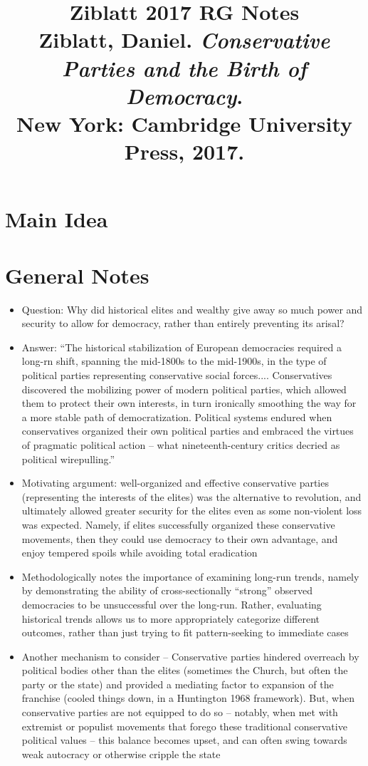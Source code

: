 \documentclass[12pt]{article}
\title{\textbf{Ziblatt 2017 RG Notes}\\
\large Ziblatt, Daniel. \textit{Conservative Parties and the Birth of Democracy}.\\
New York: Cambridge University Press, 2017.}
\author{}
\date{}
\begin{document}
\maketitle

\section{Main Idea}



\section{General Notes}

\begin{itemize}[leftmargin=*, itemsep=4pt]
    \item Question: Why did historical elites and wealthy give away so much power and security to allow for democracy, rather than entirely preventing its arisal?
    \item Answer: ``The historical stabilization of European democracies required a long-rn shift, spanning the mid-1800s to the mid-1900s, in the type of political parties representing conservative social forces.... Conservatives discovered the mobilizing power of modern political parties, which allowed them to protect their own interests, in turn ironically smoothing the way for a more stable path of democratization. Political systems endured when conservatives organized their own political parties and embraced the virtues of pragmatic political action -- what nineteenth-century critics decried as political wirepulling.''
    \item Motivating argument: well-organized and effective conservative parties (representing the interests of the elites) was the alternative to revolution, and ultimately allowed greater security for the elites even as some non-violent loss was expected. Namely, if elites successfully organized these conservative movements, then they could use democracy to their own advantage, and enjoy tempered spoils while avoiding total eradication
    \item Methodologically notes the importance of examining long-run trends, namely by demonstrating the ability of cross-sectionally ``strong'' observed democracies to be unsuccessful over the long-run. Rather, evaluating historical trends allows us to more appropriately categorize different outcomes, rather than just trying to fit pattern-seeking to immediate cases
    \item Another mechanism to consider -- Conservative parties hindered overreach by political bodies other than the elites (sometimes the Church, but often the party or the state) and provided a mediating factor to expansion of the franchise (cooled things down, in a Huntington 1968 framework). But, when conservative parties are not equipped to do so -- notably, when met with extremist or populist movements that forego these traditional conservative political values -- this balance becomes upset, and can often swing towards weak autocracy or otherwise cripple the state
\end{itemize}
\end{document}
